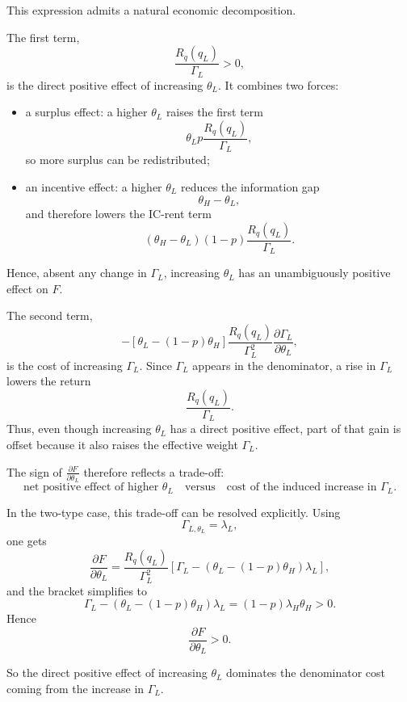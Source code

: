 \documentclass[11pt]{article}
\begin{document}
This expression admits a natural economic decomposition.

The first term,
\[
\frac{R_q(q_L)}{\Gamma_L}>0,
\]
is the direct positive effect of increasing \(\theta_L\). It combines two forces:

\begin{itemize}
    \item a surplus effect: a higher \(\theta_L\) raises the first term
    \[
    \theta_L p \frac{R_q(q_L)}{\Gamma_L},
    \]
    so more surplus can be redistributed;

    \item an incentive effect: a higher \(\theta_L\) reduces the information gap
    \[
    \theta_H-\theta_L,
    \]
    and therefore lowers the IC-rent term
    \[
    (\theta_H-\theta_L)(1-p)\frac{R_q(q_L)}{\Gamma_L}.
    \]
\end{itemize}

Hence, absent any change in \(\Gamma_L\), increasing \(\theta_L\) has an unambiguously positive effect on \(F\).

The second term,
\[
-
\left[\theta_L-(1-p)\theta_H\right]
\frac{R_q(q_L)}{\Gamma_L^2}
\frac{\partial \Gamma_L}{\partial \theta_L},
\]
is the cost of increasing \(\Gamma_L\). Since \(\Gamma_L\) appears in the denominator, a rise in \(\Gamma_L\) lowers the return
\[
\frac{R_q(q_L)}{\Gamma_L}.
\]
Thus, even though increasing \(\theta_L\) has a direct positive effect, part of that gain is offset because it also raises the effective weight \(\Gamma_L\).

The sign of \(\frac{\partial F}{\partial \theta_L}\) therefore reflects a trade-off:
\[
\text{net positive effect of higher } \theta_L
\quad
\text{versus}
\quad
\text{cost of the induced increase in } \Gamma_L.
\]

In the two-type case, this trade-off can be resolved explicitly. Using
\[
\Gamma_{L,\theta_L}=\lambda_L,
\]
one gets
\[
\frac{\partial F}{\partial \theta_L}
=
\frac{R_q(q_L)}{\Gamma_L^2}
\left[
\Gamma_L-\left(\theta_L-(1-p)\theta_H\right)\lambda_L
\right],
\]
and the bracket simplifies to
\[
\Gamma_L-\left(\theta_L-(1-p)\theta_H\right)\lambda_L
=
(1-p)\lambda_H\theta_H>0.
\]
Hence
\[
\frac{\partial F}{\partial \theta_L}>0.
\]

So the direct positive effect of increasing \(\theta_L\) dominates the denominator cost coming from the increase in \(\Gamma_L\).
\end{document}
